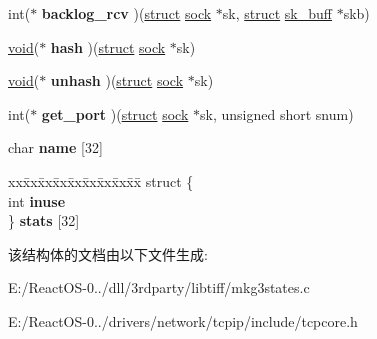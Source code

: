 \begin{DoxyCompactItemize}
\item 
\mbox{\label{structproto_a2293195770345857c70ba07d31d6a2a5}} 
int($\ast$ {\bfseries backlog\+\_\+rcv} )(\hyperlink{interfacestruct}{struct} \hyperlink{structsock}{sock} $\ast$sk, \hyperlink{interfacestruct}{struct} \hyperlink{structsk__buff}{sk\+\_\+buff} $\ast$skb)
\item 
\mbox{\label{structproto_a6eb87160b0de5d741522329d4c5e81fd}} 
\hyperlink{interfacevoid}{void}($\ast$ {\bfseries hash} )(\hyperlink{interfacestruct}{struct} \hyperlink{structsock}{sock} $\ast$sk)
\item 
\mbox{\label{structproto_a6e243cadddb5a7c764d6832ea4bcbd72}} 
\hyperlink{interfacevoid}{void}($\ast$ {\bfseries unhash} )(\hyperlink{interfacestruct}{struct} \hyperlink{structsock}{sock} $\ast$sk)
\item 
\mbox{\label{structproto_aff21ac0b992324b5d54b7695f6aa8628}} 
int($\ast$ {\bfseries get\+\_\+port} )(\hyperlink{interfacestruct}{struct} \hyperlink{structsock}{sock} $\ast$sk, unsigned short snum)
\item 
\mbox{\label{structproto_a124d95e757f50ccee4b1d858a5044f6b}} 
char {\bfseries name} \mbox{[}32\mbox{]}
\item 
\mbox{\label{structproto_ad32669090ebd7d8226a1ad7f2e1640a3}} 
\begin{tabbing}
xx\=xx\=xx\=xx\=xx\=xx\=xx\=xx\=xx\=\kill
struct \{\\
\>int {\bfseries inuse}\\
\} {\bfseries stats} \mbox{[}32\mbox{]}\\

\end{tabbing}\end{DoxyCompactItemize}


该结构体的文档由以下文件生成\+:\begin{DoxyCompactItemize}
\item 
E\+:/\+React\+O\+S-\/0../dll/3rdparty/libtiff/mkg3states.\+c\item 
E\+:/\+React\+O\+S-\/0../drivers/network/tcpip/include/tcpcore.\+h\end{DoxyCompactItemize}

